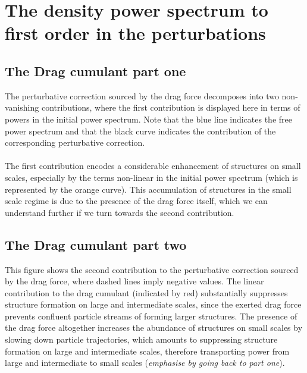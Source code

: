 \section{The density power spectrum to first order in the perturbations}
\subsection{The Drag cumulant part one}
The perturbative correction sourced by the drag force decomposes into two non-vanishing contributions, where the first contribution is displayed here in terms of powers in the initial power spectrum. Note that
the blue line indicates the free power spectrum and that the black curve indicates the contribution of the corresponding perturbative correction.
\\ \\
The first contribution encodes a considerable enhancement of structures on small scales, especially by the terms non-linear in the initial power spectrum (which is represented by the orange curve). This accumulation of structures in the small scale regime is due to the presence of the drag force itself, which we can understand further if we turn towards the second contribution.
\subsection{The Drag cumulant part two}
This figure shows the second contribution to the perturbative correction sourced by the drag force, where dashed lines imply negative values.
The linear contribution to the drag cumulant (indicated by red) substantially suppresses structure formation on large
and intermediate scales, since the exerted drag force prevents confluent particle streams of forming larger structures.
The presence of the drag force altogether increases the abundance of structures on small
scales by slowing down particle trajectories, which amounts to suppressing structure formation on large
and intermediate scales, therefore transporting power from large and intermediate to small scales (\emph{emphasise by going back to part one}).
